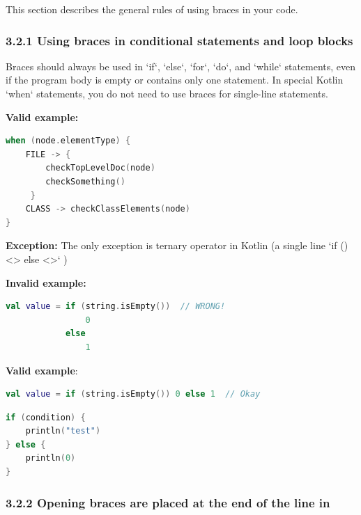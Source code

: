 \label{sec:3.2}

This section describes the general rules of using braces in your code.

\subsubsection*{\textbf{3.2.1 Using braces in conditional statements and loop blocks}}
\leavevmode\newline

\label{sec:3.2.1}



Braces should always be used in `if`, `else`, `for`, `do`, and `while` statements, even if the program body is empty or contains only one statement. In special Kotlin `when` statements, you do not need to use braces for single-line statements. 



\textbf{Valid example:}



\begin{lstlisting}[language=Kotlin]
when (node.elementType) {
    FILE -> {
        checkTopLevelDoc(node)
        checkSomething()
     }
    CLASS -> checkClassElements(node)
}
\end{lstlisting}
\textbf{Exception:} The only exception is ternary operator in Kotlin (a single line `if () <> else <>` ) 



\textbf{Invalid example:}



\begin{lstlisting}[language=Kotlin]
val value = if (string.isEmpty())  // WRONG!
                0
            else
                1
\end{lstlisting}


\textbf{Valid example}: 



\begin{lstlisting}[language=Kotlin]
val value = if (string.isEmpty()) 0 else 1  // Okay
\end{lstlisting}


\begin{lstlisting}[language=Kotlin]
if (condition) {
    println("test")
} else {
    println(0)
}
\end{lstlisting}


\subsubsection*{\textbf{3.2.2  Opening braces are placed at the end of the line in}}
\leavevmode\newline

